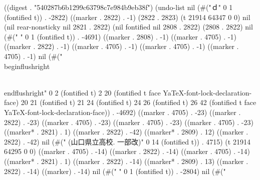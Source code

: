
((digest . "540287b6b1299c63798c7e984b9eb38f") (undo-list nil (#("ｄ" 0 1 (fontified t)) . -2822) ((marker . 2822) . -1) (2822 . 2823) (t 21914 64347 0 0) nil (nil rear-nonsticky nil 2821 . 2822) (nil fontified nil 2808 . 2822) (2808 . 2822) nil (#("
" 0 1 (fontified t)) . -4691) ((marker . 2808) . -1) ((marker . 4705) . -1) ((marker . 2822) . -1) ((marker . 4705) . -1) ((marker . 4705) . -1) ((marker . 4705) . -1) nil (#("  \\begin{flushright}
  
  \\end{flushright}" 0 2 (fontified t) 2 20 (fontified t face YaTeX-font-lock-declaration-face) 20 21 (fontified t) 21 24 (fontified t) 24 26 (fontified t) 26 42 (fontified t face YaTeX-font-lock-declaration-face)) . -4692) ((marker . 4705) . -23) ((marker . 2822) . -23) ((marker . 4705) . -23) ((marker . 4705) . -23) ((marker . 4705) . -23) ((marker* . 2821) . 1) ((marker . 2822) . -42) ((marker* . 2809) . 12) ((marker . 2822) . -42) nil (#(" (山口県立高校. 一部改)" 0 14 (fontified t)) . 4715) (t 21914 64295 0 0) ((marker . 4705) . -14) ((marker . 2822) . -14) ((marker . 4705) . -14) ((marker* . 2821) . 1) ((marker . 2822) . -14) ((marker* . 2809) . 13) ((marker . 2822) . -14) ((marker) . -14) nil (#(" " 0 1 (fontified t)) . -2804) nil (#("
